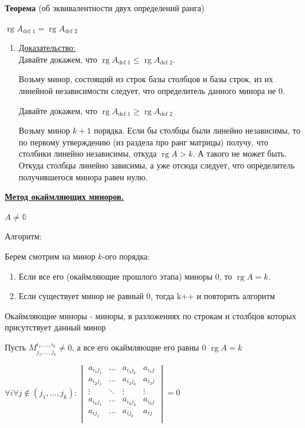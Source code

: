 \documentclass[twoside]{book}
\DeclareMathOperator{\rg}{rg}
\newcommand{\prooff}[1]{{\underline{Доказательство:}} \\ }
\begin{document}
\textbf{Теорема} (об эквивалентности двух определений ранга)

\( \rg A_{\text{def 1}} = \rg A_{\text{def 2}}\)

\begin{enumerate}
    \item[]\prooff{} Давайте докажем, что \( \rg A_{\text{def 1}} \leq \rg A_{\text{def 2}}\).

          Возьму минор, состоящий из строк базы столбцов и базы строк, из их линейной независимости следует, что определитель данного минора не 0.


          Давайте докажем, что \( \rg A_{\text{def 1}} \geq \rg A_{\text{def 2}}\)

          Возьму минор $k+1$ порядка. Если бы столбцы были линейно независимы, то по первому утверждению (из раздела про ранг матрицы) получу, что столбики линейно независимы, откуда $\rg A > k$. А такого не может быть. Откуда столбцы линейно зависимы, а уже отсюда следует, что определитель получившегося минора равен нулю.

\end{enumerate}



\uline{\textbf{Метод окаймляющих миноров.}}

\(A \neq \mathbb{0}\)

Алгоритм:

Берем смотрим на минор \(k\)-ого порядка:
\begin{enumerate}
    \item Если все его (окаймляющие прошлого этапа) миноры 0, то \(\rg A = k\).
    \item Если существует минор не равный 0, тогда k++ и повторить алгоритм
\end{enumerate}

Окаймляющие миноры - миноры, в разложениях по строкам и столбцов которых присутствует данный минор

Пусть \(M_{j_1, \ldots, j_k}^{i_1, \ldots, i_k} \neq 0\), а все его окаймляющие его равны 0 \(\rg A = k\)

\(\forall i \forall j \notin(j_1,
\ldots, j_k):
\begin{vmatrix}
    a_{i_1 j_1} & \ldots & a_{i_1 j_k} & a_{i_1 j} \\
    a_{i_2 j_1} & \ldots & a_{i_2 j_k} & a_{i_2 j} \\
    \vdots      & \ddots & \vdots      & \vdots    \\
    a_{i_k j_1} & \ldots & a_{i_k j_k} & a_{i_k j} \\
    a_{i j_1}   & \ldots & a_{i j_k}   & a_{i j}   \\
\end{vmatrix} = 0\)
\end{document}
